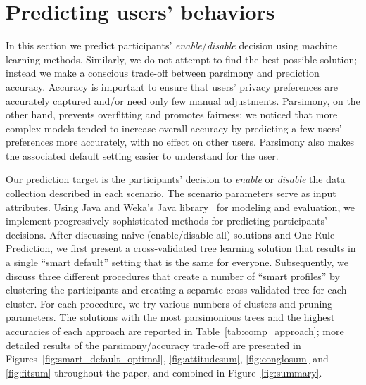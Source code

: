 \section{Predicting users' behaviors}\label{sec:predict}
In this section we predict participants' \textit{enable}/\textit{disable} decision using machine learning methods. Similarly, we do not attempt to find the best possible solution; instead we make a conscious trade-off between parsimony and prediction accuracy. Accuracy is important to ensure that users' privacy preferences are accurately captured and/or need only few manual adjustments. Parsimony, on the other hand, prevents overfitting and promotes fairness: we noticed that more complex models tended to increase overall accuracy by predicting a few users' preferences more accurately, with no effect on other users. Parsimony also makes the associated default setting easier to understand for the user.


Our prediction target is the participants' decision to \textit{enable} or \textit{disable} the data collection described in each scenario. The scenario parameters serve as input attributes. Using Java and Weka's Java library~\cite{witten2016data} for modeling and evaluation, we implement progressively sophisticated methods for predicting participants' decisions. After discussing naive (enable/disable all) solutions and One Rule Prediction, we first present a cross-validated tree learning solution that results in a single ``smart default'' setting that is the same for everyone. Subsequently, we discuss three different procedures that create a number of ``smart profiles'' by clustering the participants and creating a separate cross-validated tree for each cluster. For each procedure, we try various numbers of clusters and pruning parameters. The solutions with the most parsimonious trees and the highest accuracies of each approach are reported in Table~\ref{tab:comp_approach}; more detailed results of the parsimony/accuracy trade-off are presented in Figures~\ref{fig:smart_default_optimal}, \ref{fig:attitudesum}, \ref{fig:conglosum} and \ref{fig:fitsum} throughout the paper, and combined in Figure~\ref{fig:summary}.

